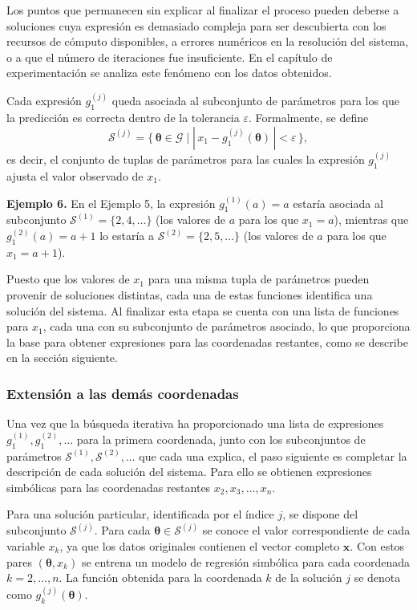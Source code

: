 \documentclass[12pt,a4paper]{article} \usepackage[utf8]{inputenc} \usepackage[spanish]{babel} \usepackage{amsmath, amssymb, amsthm} \usepackage{bm} \usepackage{float} \usepackage{longtable} \usepackage[hidelinks]{hyperref}
\newcommand{\xvec}{\mathbf{x}} \newcommand{\thetavec}{\boldsymbol{\theta}} \newcommand{\Fvec}{\mathbf{F}} \newcommand{\R}{\mathbb{R}} \newcommand{\norm}[1]{\left\lVert#1\right\rVert} \newcommand{\loss}{\mathcal{L}} \newcommand{\dataset}{\mathcal{D}} \newcommand{\jac}{\mathbf{J}}
\begin{document}
Los puntos que permanecen sin explicar al finalizar el proceso pueden
deberse a soluciones cuya expresión es demasiado compleja para ser
descubierta con los recursos de cómputo disponibles, a errores
numéricos en la resolución del sistema, o a que el número de
iteraciones fue insuficiente. En el capítulo de experimentación se
analiza este fenómeno con los datos obtenidos.

Cada expresión \(g_1^{(j)}\) queda asociada al subconjunto de
parámetros para los que la predicción es correcta dentro de la
tolerancia \(\varepsilon\). Formalmente, se define
\[
\mathcal{S}^{(j)} = \{\,\thetavec \in \mathcal{G} \mid
|\,x_1 - g_1^{(j)}(\thetavec)\,| < \varepsilon \,\},
\]
es decir, el conjunto de tuplas de parámetros para las cuales la
expresión \(g_1^{(j)}\) ajusta el valor observado de \(x_1\).

\bigskip
\noindent\textbf{Ejemplo 6.} En el Ejemplo 5, la expresión
\(g_1^{(1)}(a) = a\) estaría asociada al subconjunto
\(\mathcal{S}^{(1)} = \{2, 4, \dots\}\) (los valores de \(a\) para los
que \(x_1 = a\)), mientras que \(g_1^{(2)}(a) = a + 1\) lo estaría a
\(\mathcal{S}^{(2)} = \{2, 5, \dots\}\) (los valores de \(a\) para los
que \(x_1 = a + 1\)).

Puesto que los valores de \(x_1\) para una misma tupla de parámetros
pueden provenir de soluciones distintas, cada una de estas funciones
identifica una solución del sistema. Al finalizar esta etapa se cuenta
con una lista de funciones para \(x_1\), cada una con su subconjunto de
parámetros asociado, lo que proporciona la base para obtener
expresiones para las coordenadas restantes, como se describe en la
sección siguiente.

\subsubsection{Extensión a las demás coordenadas}
\label{sec:extension_coordenadas}

Una vez que la búsqueda iterativa ha proporcionado una lista de
expresiones \(g_1^{(1)}, g_1^{(2)}, \dots\) para la primera coordenada,
junto con los subconjuntos de parámetros \(\mathcal{S}^{(1)},
\mathcal{S}^{(2)}, \dots\) que cada una explica, el paso siguiente es
completar la descripción de cada solución del sistema. Para ello se
obtienen expresiones simbólicas para las coordenadas restantes
\(x_2, x_3, \dots, x_n\).

Para una solución particular, identificada por el índice \(j\), se
dispone del subconjunto \(\mathcal{S}^{(j)}\). Para cada
\(\thetavec \in \mathcal{S}^{(j)}\) se conoce el valor correspondiente
de cada variable \(x_k\), ya que los datos originales contienen el
vector completo \(\xvec\). Con estos pares \((\thetavec, x_k)\) se
entrena un modelo de regresión simbólica para cada coordenada
\(k = 2, \dots, n\). La función obtenida para la coordenada \(k\) de
la solución \(j\) se denota como \(g_k^{(j)}(\thetavec)\).
\end{document}
